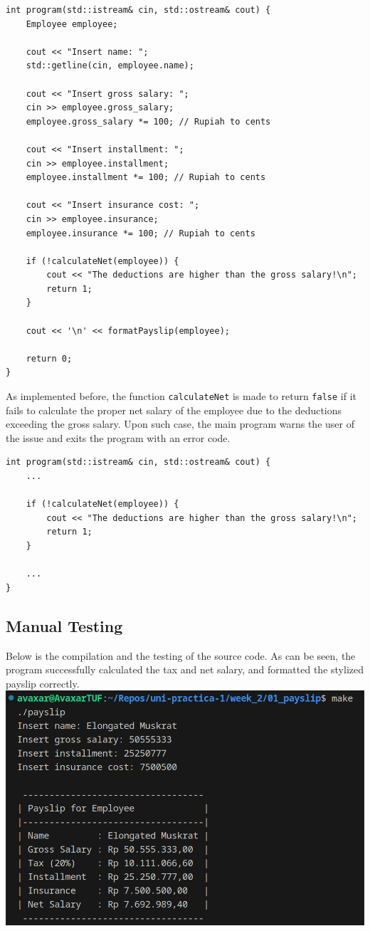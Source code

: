 \documentclass[12pt]{article}
\begin{document}
\begin{verbatim}
int program(std::istream& cin, std::ostream& cout) {
    Employee employee;

    cout << "Insert name: ";
    std::getline(cin, employee.name);

    cout << "Insert gross salary: ";
    cin >> employee.gross_salary;
    employee.gross_salary *= 100; // Rupiah to cents

    cout << "Insert installment: ";
    cin >> employee.installment;
    employee.installment *= 100; // Rupiah to cents

    cout << "Insert insurance cost: ";
    cin >> employee.insurance;
    employee.insurance *= 100; // Rupiah to cents

    if (!calculateNet(employee)) {
        cout << "The deductions are higher than the gross salary!\n";
        return 1;
    }

    cout << '\n' << formatPayslip(employee);

    return 0;
}
\end{verbatim}

As implemented before, the function \texttt{calculateNet} is made to return \texttt{false} if it fails to calculate the proper net salary of the employee due to the deductions exceeding the gross salary. Upon such case, the main program warns the user of the issue and exits the program with an error code.

\begin{verbatim}
int program(std::istream& cin, std::ostream& cout) {
    ...

    if (!calculateNet(employee)) {
        cout << "The deductions are higher than the gross salary!\n";
        return 1;
    }

    ...
}
\end{verbatim}

\subsection{Manual Testing}
Below is the compilation and the testing of the source code. As can be seen, the program successfully calculated the tax and net salary, and formatted the stylized payslip correctly.
\newline\includegraphics[width=\textwidth]{01_payslip}
\end{document}
